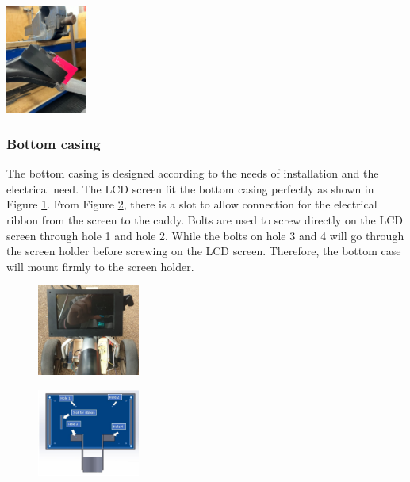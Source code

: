 \documentclass[11pt,landscape]{article}
\newenvironment{Figure}
  {\par\medskip\noindent\minipage{\linewidth}}
  {\endminipage\par\medskip}
\begin{document}
\begin{multicols}{3}
    \begin{Figure}
        \begin{center}
            \includegraphics[width=0.2\textwidth]{Figure18.jpg}
            \label{fig:fold}
        \end{center}
    \end{Figure}
    
    
    \subsubsection{Bottom casing}
    The bottom casing is designed according to the needs of installation and the
    electrical need. The LCD screen fit the bottom casing perfectly as shown in
    Figure \ref{fig:LCD}. From Figure \ref{fig:bottom}, there is a slot to allow
    connection for the electrical ribbon from the screen to the caddy. Bolts are
    used to screw directly on the LCD screen through hole 1 and hole 2. While
    the bolts on hole 3 and 4 will go through the screen holder before screwing
    on the LCD screen. Therefore, the bottom case will mount firmly to the
    screen holder.
    
    \begin{figure}[H]
        \begin{center}
            \includegraphics[width=0.3\textwidth]{Figure32.jpg}
            \label{fig:LCD}
        \end{center}
    \end{figure}
    
    
    \begin{figure}[H]
        \begin{center}
            \includegraphics[width=0.3\textwidth]{Figure11.jpg}
            \label{fig:bottom}
        \end{center}
    \end{figure}
    


\end{multicols}
\end{document}
